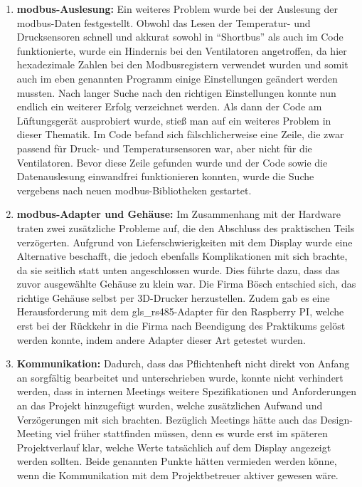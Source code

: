 \begin{enumerate}
	\item \textbf{\gls{modbus}-Auslesung:} Ein weiteres Problem wurde bei der Auslesung der \gls{modbus}-Daten festgestellt. Obwohl das Lesen der Temperatur- und Drucksensoren schnell und akkurat sowohl in \enquote{Shortbus} als auch im Code funktionierte, wurde ein Hindernis bei den Ventilatoren angetroffen, da hier hexadezimale Zahlen bei den Modbusregistern verwendet wurden und somit auch im eben genannten Programm einige Einstellungen geändert werden mussten. Nach langer Suche nach den richtigen Einstellungen konnte nun endlich ein weiterer Erfolg verzeichnet werden. Als dann der Code am Lüftungsgerät ausprobiert wurde, stieß man auf ein weiteres Problem in dieser Thematik. Im Code befand sich fälschlicherweise eine Zeile, die zwar passend für Druck- und Temperatursensoren war, aber nicht für die Ventilatoren. Bevor diese Zeile gefunden wurde und der Code sowie die Datenauslesung einwandfrei funktionieren konnten, wurde die Suche vergebens nach neuen \gls{modbus}-Bibliotheken gestartet.
	\item \textbf{\gls{modbus}-Adapter und Gehäuse:} Im Zusammenhang mit der Hardware traten zwei zusätzliche Probleme auf, die den Abschluss des praktischen Teils verzögerten. Aufgrund von Lieferschwierigkeiten mit dem Display wurde eine Alternative beschafft, die jedoch ebenfalls Komplikationen mit sich brachte, da sie seitlich statt unten angeschlossen wurde. Dies führte dazu, dass das zuvor ausgewählte Gehäuse zu klein war. Die Firma Bösch entschied sich, das richtige Gehäuse selbst per 3D-Drucker herzustellen. Zudem gab es eine Herausforderung mit dem \gls{gls_rs485}-Adapter für den Raspberry PI, welche erst bei der Rückkehr in die Firma nach Beendigung des Praktikums gelöst werden konnte, indem andere Adapter dieser Art getestet wurden.
	\item \textbf{Kommunikation:} Dadurch, dass das Pflichtenheft nicht direkt von Anfang an sorgfältig bearbeitet und unterschrieben wurde, konnte nicht verhindert werden, dass in internen Meetings weitere Spezifikationen und Anforderungen an das Projekt hinzugefügt wurden, welche zusätzlichen Aufwand und Verzögerungen mit sich brachten. Bezüglich Meetings hätte auch das Design-Meeting viel früher stattfinden müssen, denn es wurde erst im späteren Projektverlauf klar, welche Werte tatsächlich auf dem Display angezeigt werden sollten. Beide genannten Punkte hätten vermieden werden könne, wenn die Kommunikation mit dem Projektbetreuer aktiver gewesen wäre.
\end{enumerate}
